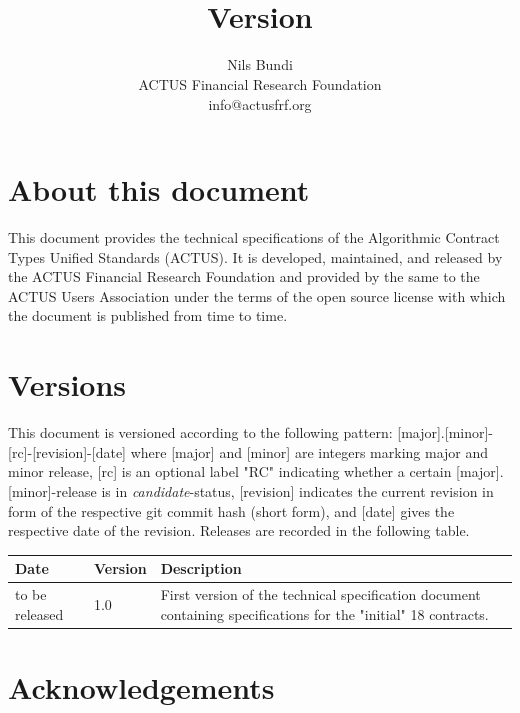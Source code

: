 \documentclass[9pt,oneside]{amsart}
\title{\doctitle \\
      {\smaller \textbf{Version \VersionNumber}}}
\author{
	Nils Bundi\\
	ACTUS Financial Research Foundation\\
	info@actusfrf.org
}
\begin{document}
%

\maketitle


\section*{About this document}\label{sec:about}

This document provides the technical specifications of the Algorithmic Contract Types Unified Standards (ACTUS). It is developed, maintained, and released by the ACTUS Financial Research Foundation and provided by the same to the ACTUS Users Association under the terms of the open source license with which the document is published from time to time.


\section*{Versions}\label{sec:version}

This document is versioned according to the following pattern: [major].[minor]-[rc]-[revision]-[date] where [major] and [minor] are integers marking major and minor release, [rc] is an optional label "RC" indicating whether a certain [major].[minor]-release is in \textit{candidate}-status, [revision] indicates the current revision in form of the respective git commit hash (short form), and [date] gives the respective date of the revision. Releases are recorded in the following table.

\begin{table}[H]
  \centering
  \begin{tabular}{| p{} | p{} | p{} |}
  \hline
  Date & Version & Description \\ 
  \hline
  to be released & 1.0 & First version of the technical specification document containing specifications for the "initial" 18 contracts.\\
  \hline
  \end{tabular}
\end{table}


\section*{Acknowledgements}\label{sec:ack}
\end{document}
